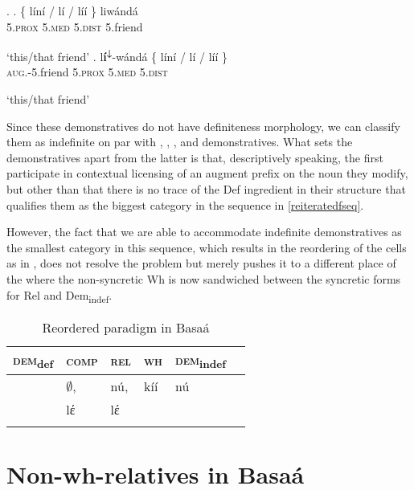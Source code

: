 \ex. \label{Bas:liwanda}
\ag. \{ l\'in\'i / l\'i / {l\'i\'i \}} liw\'and\'a \\
 {} 5.\textsc{prox} {} 5.\textsc{med} {} {5.\textsc{dist}} 5.friend\\
\strut `this/that friend'
\bg.  l\textbf{\'i\textsuperscript{↓}}-w\'and\'a \{ l\'in\'i / l\'i / {l\'i\'i \}}\\
 \textsc{aug.}-5.friend  {} 5.\textsc{prox} {} 5.\textsc{med} {} {5.\textsc{dist}}\\
\strut `this/that friend'

Since these demonstratives do not have definiteness morphology, we can classify them as indefinite on par with , , , and  demonstratives. What sets the  demonstratives apart from the latter is that, descriptively speaking, the first participate in contextual licensing of an augment prefix on the noun they modify, but other than that there is no trace of the Def ingredient in their structure that qualifies them as the biggest category in the sequence in \ref{reiteratedfseq}.  
\par
However, the fact that we are able to accommodate indefinite demonstratives as the smallest category in this sequence, which results in the reordering of the cells as in , does not resolve the  problem but merely pushes it to a different place of the  where the non-syncretic Wh is now sandwiched between the syncretic forms for Rel and Dem\textsubscript{indef}. 

\begin{table}
\caption{Reordered paradigm in Basa\'a}
\label{table3}
\begin{tabular}[t]{ l l l l l l }
\lsptoprule
\textsc{dem}\textsubscript{def} & \textsc{comp} 	& \textsc{rel}  	& \textsc{wh} & \textsc{dem}\textsubscript{indef}\\	
 \midrule
& $\emptyset$, & n\'u,\cellcolor[gray]{0.9} & k\'i\'i  & n\'u\cellcolor[gray]{0.9}\\
& lέ\cellcolor[gray]{0.8} & lέ\cellcolor[gray]{0.8} & \\
\lspbottomrule
\end{tabular}
\end{table}

\section{Non-wh-relatives in Basa\'a}

